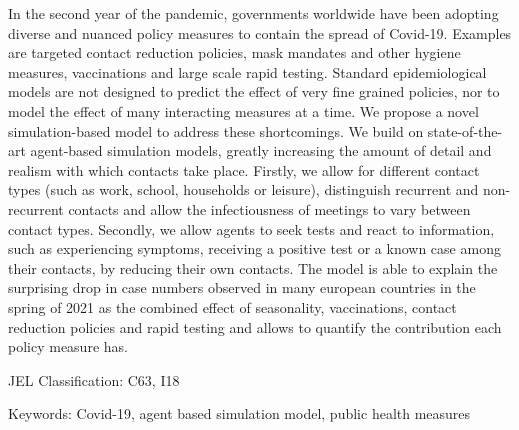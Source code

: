 \noindent
In the second year of the pandemic, governments worldwide have been adopting diverse and nuanced policy measures to contain the spread of Covid-19.
Examples are targeted contact reduction policies, mask mandates and other hygiene measures, vaccinations and large scale rapid testing.
Standard epidemiological models are not designed to predict the effect of very fine grained policies, nor to model the effect of many interacting measures at a time.
%
We propose a novel simulation-based model to address these shortcomings. We build on
state-of-the-art agent-based simulation models, greatly increasing the amount of detail
and realism with which contacts take place. Firstly, we allow for different contact
types (such as work, school, households or leisure), distinguish recurrent and
non-recurrent contacts and allow the infectiousness of meetings to vary between contact
types.
Secondly, we allow agents to seek tests and react to information, such as experiencing
symptoms, receiving a positive test or a known case among their contacts, by reducing
their own contacts.
The model is able to explain the surprising drop in case numbers observed in many european countries in the spring of 2021 as the combined effect of seasonality,
vaccinations, contact reduction policies and rapid testing and allows to quantify
the contribution each policy measure has.


\vspace{1cm}
\noindent JEL Classification: C63, I18

\noindent Keywords: Covid-19, agent based simulation model, public health measures

